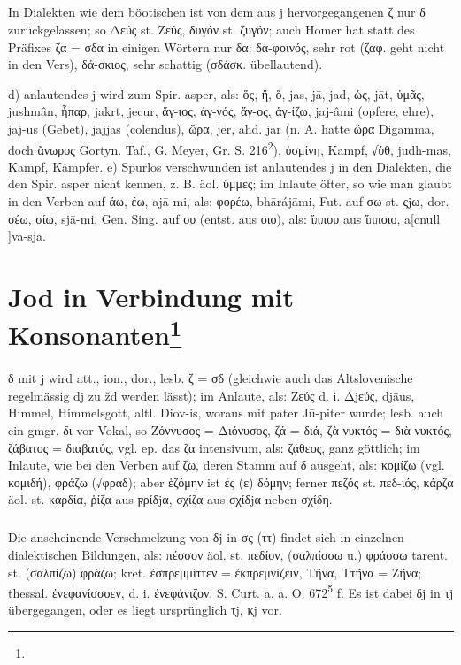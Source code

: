 {\small\noindent\subparagraph{} In Dialekten wie dem böotischen ist von dem aus
  j hervorgegangenen ζ nur δ zurückgelassen; so  Δεύς st. Ζεύς, δυγόν st.
  ζυγόν; auch Homer hat statt des Präfixes ζα = σδα in einigen Wörtern nur δα:
  δα-φοινός, sehr rot (ζαφ. geht nicht in den Vers), δά-σκιος, sehr schattig
  (σδάσκ. übellautend).}

  d) anlautendes j wird zum Spir. asper, als: ὅς, ἥ, ὅ,
   jas, jā, jad, ὡς,  jāt, ὑμᾶς,  jushmân, ἧπαρ,  jakrt,  jecur,
  ἅγ-ιος, ἁγ-νός, ἅγ-ος, ἁγ-ίζω,  jaj-âmi (opfere, ehre), jaj-us (Gebet),
  jajjas (colendus), ὥρα,  jēr, ahd. jār (n. A. hatte ὥρα Digamma, doch
  ἄνωρος Gortyn. Taf., G. Meyer, Gr. S. 216\textsuperscript{2}), ὑσμίνη, Kampf,
  √ὑθ,  judh-mas, Kampf, Kämpfer. e) Spurlos verschwunden ist
  anlautendes j in den Dialekten, die den Spir. asper nicht kennen, z. B. äol.
  ὔμμες; im Inlaute öfter, so wie man glaubt in den Verben auf άω, έω, 
  ajā-mi, als: φορέω,  bhārájāmi, Fut. auf σω st. ςjω, dor. σέω, σίω, 
  sjā-mi, Gen. Sing. auf ου (entst. aus οιο), als: ἵππου aus ἵπποιο,  a[cnull
]va-sja.

\section[Jod in Verbindung mit Konsonanten]{Jod in Verbindung mit Konsonanten\protect\footnote{}}

\paragraph{} δ mit j wird att., ion., dor., lesb. ζ = σδ (gleichwie auch das Altslovenische regelmässig dj zu žd werden lässt); im Anlaute, als: Ζεύς d. i. Δjεύς,  djāus, Himmel, Himmelsgott, altl. Diov-is, woraus mit pater Jū-piter wurde; lesb. auch ein gmgr. δι vor Vokal, so Ζόννυσος = Διόνυσος, ζά = διά, ζὰ νυκτός = διὰ νυκτός, ζάβατος = διαβατύς, vgl. ep. das ζα intensivum, als: ζάθεος, ganz göttlich; im Inlaute, wie bei den Verben auf ζω, deren Stamm auf δ ausgeht, als: κομίζω (vgl. κομιδή), φράζω (√φραδ); aber ἑζόμην ist ἑς (ε) δόμην; ferner πεζός st. πεδ-ιός, κάρζα äol. st. καρδία, ῥίζα aus ϝρίδjα, σχίζα aus σχίδjα neben σχίδη. 

{\small\noindent\subparagraph{} Die anscheinende Verschmelzung von δj in σς (ττ)
  findet sich in einzelnen dialektischen Bildungen, als: πέσσον äol. st. πεδίον,
  (σαλπίσσω u.) φράσσω tarent. st. (σαλπίζω) φράζω; kret. ἐσπρεμμίττεν =
  ἐκπρεμνίζειν, Τῆνα, Ττῆνα = Ζῆνα; thessal. ἐνεφανίσσοεν, d. i. ἐνεφάνιζον. S.
  Curt. a. a. O. 672\textsuperscript{5} f. Es ist dabei δj in τj übergegangen,
oder es liegt ursprünglich τj, κj vor. }

